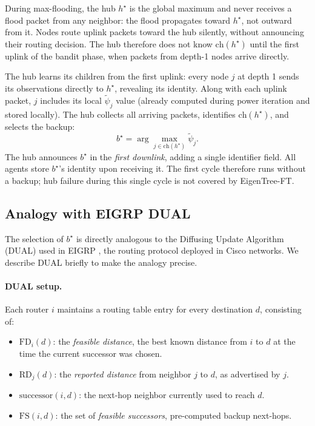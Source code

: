 \documentclass{article}
\newcommand{\merwft}{EigenTree-FT}
\begin{document}
During max-flooding, the hub $h^\star$ is the global maximum and never receives a flood
packet from any neighbor: the flood propagates toward $h^\star$, not outward from it.
Nodes route uplink packets toward the hub silently, without announcing their routing
decision. The hub therefore does not know $\mathrm{ch}(h^\star)$ until the first uplink
of the bandit phase, when packets from depth-1 nodes arrive directly.

The hub learns its children from the first uplink: every node $j$ at depth 1 sends its
observations directly to $h^\star$, revealing its identity. Along with each uplink packet,
$j$ includes its local $\tilde{\psi}_j$ value (already computed during power iteration
and stored locally). The hub collects all arriving packets, identifies
$\mathrm{ch}(h^\star)$, and selects the backup:
\[
    b^\star = \arg\max_{j \in \mathrm{ch}(h^\star)} \tilde{\psi}_j.
\]
The hub announces $b^\star$ in the \emph{first downlink}, adding a single identifier
field. All agents store $b^\star$'s identity upon receiving it. The first cycle therefore
runs without a backup; hub failure during this single cycle is not covered by \merwft.

\subsection{Analogy with EIGRP DUAL}

The selection of $b^\star$ is directly analogous to the Diffusing Update Algorithm (DUAL)
used in EIGRP \cite{garcia1993eigrp}, the routing protocol deployed in Cisco networks.
We describe DUAL briefly to make the analogy precise.

\paragraph{DUAL setup.} Each router $i$ maintains a routing table entry for every
destination $d$, consisting of:
\begin{itemize}
    \item $\mathrm{FD}_i(d)$: the \emph{feasible distance}, the best known distance from
        $i$ to $d$ at the time the current successor was chosen.
    \item $\mathrm{RD}_j(d)$: the \emph{reported distance} from neighbor $j$ to $d$,
        as advertised by $j$.
    \item $\mathrm{successor}(i, d)$: the next-hop neighbor currently used to reach $d$.
    \item $\mathrm{FS}(i, d)$: the set of \emph{feasible successors}, pre-computed
        backup next-hops.
\end{itemize}
\end{document}
